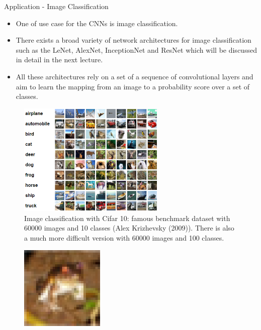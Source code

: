 





\newcommand{\titlefigure}{figure/alexnetfront.png}
\newcommand{\learninggoals}{
  \item Application of CNNs in Visual Recognition
}


\begin{vbframe}{Application - Image Classification}
    \begin{itemize}
        \item One of use case for the CNNs is image classification.
        \item There exists a broad variety of network architectures for image classification such as the LeNet, AlexNet, InceptionNet and ResNet which will be discussed in detail in the next lecture.
        \item All these architectures rely on a set of a sequence of convolutional layers and aim to learn the mapping from an image to a probability score over a set of classes.
    \end{itemize}
\framebreak
    \begin{figure}
        \centering
        \includegraphics[width=7cm]{figure/recognition.png}
        \caption{Image classification with Cifar 10: famous benchmark dataset with 60000 images and 10 classes (Alex Krizhevsky (2009)). There is also a much more difficult version with 60000 images and 100 classes.}
    \end{figure}
\framebreak
    \begin{figure}
        \centering
        \includegraphics[width=4cm]{figure/cifar_frog.png}

\end{figure}
\end{vbframe}
